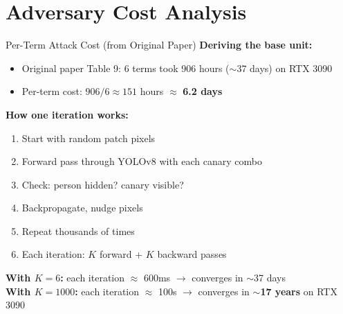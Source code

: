 \documentclass[aspectratio=169,11pt]{beamer}
\begin{document}
\section{Adversary Cost Analysis}

\begin{frame}{Per-Term Attack Cost (from Original Paper)}
\textbf{Deriving the base unit:}
\begin{itemize}
    \item Original paper Table 9: 6 terms took 906 hours ($\sim$37 days) on RTX 3090
    \item Per-term cost: $906 / 6 \approx 151$ hours $\approx$ \textbf{6.2 days}
\end{itemize}

\vspace{0.3cm}
\textbf{How one iteration works:}
\begin{enumerate}
    \item Start with random patch pixels
    \item Forward pass through YOLOv8 with each canary combo
    \item Check: person hidden? canary visible?
    \item Backpropagate, nudge pixels
    \item Repeat thousands of times
    \item Each iteration: $K$ forward + $K$ backward passes
\end{enumerate}

\vspace{0.3cm}
\textbf{With $K=6$:} each iteration $\approx$ 600ms $\to$ converges in $\sim$37 days\\
\textbf{With $K=1000$:} each iteration $\approx$ 100s $\to$ converges in $\sim$\textbf{17 years} on RTX 3090
\end{frame}
\end{document}
